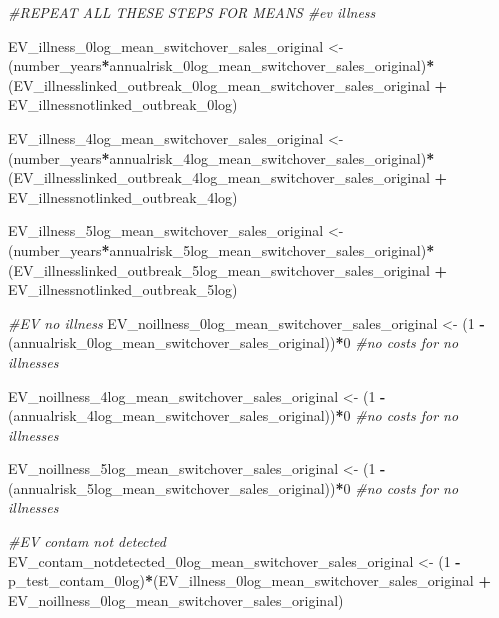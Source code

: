 \documentclass[
]{article}
\newenvironment{Shaded}{\begin{snugshade}}{\end{snugshade}}
\newcommand{\CommentTok}[1]{\textcolor[rgb]{0.56,0.35,0.01}{\textit{#1}}}
\newcommand{\DecValTok}[1]{\textcolor[rgb]{0.00,0.00,0.81}{#1}}
\newcommand{\NormalTok}[1]{#1}
\newcommand{\OtherTok}[1]{\textcolor[rgb]{0.56,0.35,0.01}{#1}}
\newcommand{\SpecialCharTok}[1]{\textcolor[rgb]{0.81,0.36,0.00}{\textbf{#1}}}
\begin{document}
\begin{Shaded}
\begin{Highlighting}[]
\CommentTok{\#REPEAT ALL THESE STEPS FOR MEANS}
\CommentTok{\#ev illness}

\NormalTok{EV\_illness\_0log\_mean\_switchover\_sales\_original }\OtherTok{\textless{}{-}}\NormalTok{ (number\_years}\SpecialCharTok{*}\NormalTok{annualrisk\_0log\_mean\_switchover\_sales\_original)}\SpecialCharTok{*}\NormalTok{(EV\_illnesslinked\_outbreak\_0log\_mean\_switchover\_sales\_original }\SpecialCharTok{+}\NormalTok{ EV\_illnessnotlinked\_outbreak\_0log)}


\NormalTok{EV\_illness\_4log\_mean\_switchover\_sales\_original }\OtherTok{\textless{}{-}}\NormalTok{ (number\_years}\SpecialCharTok{*}\NormalTok{annualrisk\_4log\_mean\_switchover\_sales\_original)}\SpecialCharTok{*}\NormalTok{(EV\_illnesslinked\_outbreak\_4log\_mean\_switchover\_sales\_original }\SpecialCharTok{+}\NormalTok{ EV\_illnessnotlinked\_outbreak\_4log)}

\NormalTok{EV\_illness\_5log\_mean\_switchover\_sales\_original }\OtherTok{\textless{}{-}}\NormalTok{ (number\_years}\SpecialCharTok{*}\NormalTok{annualrisk\_5log\_mean\_switchover\_sales\_original)}\SpecialCharTok{*}\NormalTok{(EV\_illnesslinked\_outbreak\_5log\_mean\_switchover\_sales\_original }\SpecialCharTok{+}\NormalTok{ EV\_illnessnotlinked\_outbreak\_5log)}


\CommentTok{\#EV no illness}
\NormalTok{EV\_noillness\_0log\_mean\_switchover\_sales\_original }\OtherTok{\textless{}{-}}\NormalTok{ (}\DecValTok{1} \SpecialCharTok{{-}}\NormalTok{ (annualrisk\_0log\_mean\_switchover\_sales\_original))}\SpecialCharTok{*}\DecValTok{0} \CommentTok{\#no costs for no illnesses}

\NormalTok{EV\_noillness\_4log\_mean\_switchover\_sales\_original }\OtherTok{\textless{}{-}}\NormalTok{ (}\DecValTok{1} \SpecialCharTok{{-}}\NormalTok{ (annualrisk\_4log\_mean\_switchover\_sales\_original))}\SpecialCharTok{*}\DecValTok{0} \CommentTok{\#no costs for no illnesses}

\NormalTok{EV\_noillness\_5log\_mean\_switchover\_sales\_original }\OtherTok{\textless{}{-}}\NormalTok{ (}\DecValTok{1} \SpecialCharTok{{-}}\NormalTok{ (annualrisk\_5log\_mean\_switchover\_sales\_original))}\SpecialCharTok{*}\DecValTok{0} \CommentTok{\#no costs for no illnesses}



\CommentTok{\#EV contam not detected}
\NormalTok{EV\_contam\_notdetected\_0log\_mean\_switchover\_sales\_original }\OtherTok{\textless{}{-}}\NormalTok{ (}\DecValTok{1} \SpecialCharTok{{-}}\NormalTok{ p\_test\_contam\_0log)}\SpecialCharTok{*}\NormalTok{(EV\_illness\_0log\_mean\_switchover\_sales\_original }\SpecialCharTok{+}\NormalTok{ EV\_noillness\_0log\_mean\_switchover\_sales\_original)}


\end{Highlighting}
\end{Shaded}
\end{document}
